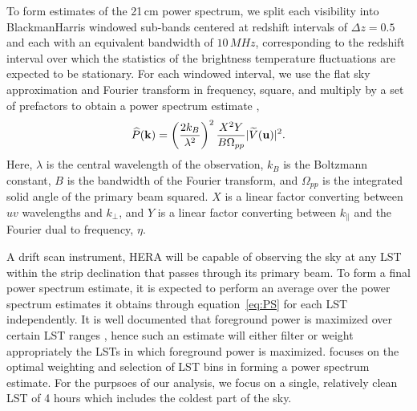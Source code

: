 \documentclass[twocolumn]{emulateapj}
\begin{document}
To form estimates of the 21\,cm power spectrum, we split each visibility into BlackmanHarris windowed sub-bands centered at redshift intervals of $\Delta z = 0.5$ and each with an equivalent bandwidth of $10\,MHz$, corresponding to the redshift interval over which the statistics of the brightness temperature fluctuations are expected to be stationary. For each windowed interval, we use the flat sky approximation and  Fourier transform in frequency, square, and multiply by a set of prefactors to obtain a power spectrum estimate \citep{Parsons:2014},
\begin{equation}\label{eq:PS}
\widehat{P}({\bf k}) = \left( \frac{2 k_B}{\lambda^2} \right)^2 \frac{X^2 Y}{B \Omega_{pp}} | \widetilde{V}({\bf u}) |^2.
\end{equation}
Here, $\lambda$ is the central wavelength of the observation, $k_B$ is the Boltzmann constant, $B$ is the bandwidth of the Fourier transform, and $\Omega_{pp}$ is the integrated solid angle of the primary beam squared. $X$ is a linear factor converting between $uv$ wavelengths and $k_\perp$, and $Y$ is a linear factor converting between $k_\parallel$ and the Fourier dual to frequency, $\eta$. 

A drift scan instrument, HERA will be capable of observing the sky at any LST within the strip declination that passes through its primary beam. To form a final power spectrum estimate, it is expected to perform an average over the power spectrum estimates it obtains through equation~\ref{eq:PS} for each LST independently. It is well documented that foreground power is maximized over certain LST ranges \citep{Thyagarajan:2015a}, hence such an estimate will either filter or weight appropriately the LSTs in which foreground power is maximized. \citet{Thyagarajan:2015c} focuses on the optimal weighting and selection of LST bins in forming a power spectrum estimate. For the purpsoes of our analysis, we focus on a single, relatively clean LST of 4 hours which includes the coldest part of the sky. 
\end{document}
